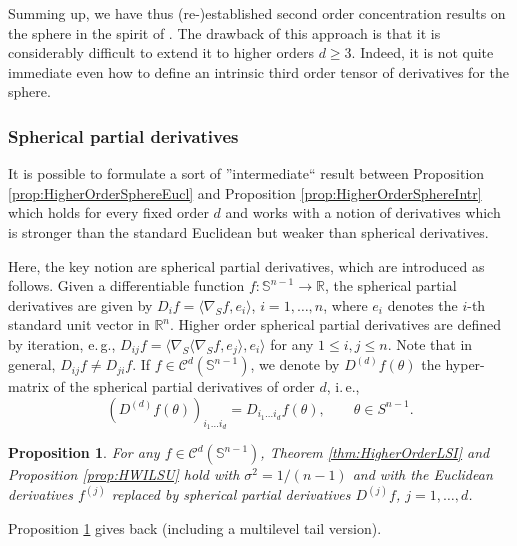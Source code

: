 \documentclass[a4paper,12pt]{amsart}
\numberwithin{equation}{section}
\newtheorem{proposition}[satz]{Proposition}
\theoremstyle{remark}
\def\S{{\mathbb S}}
\begin{document}
Summing up, we have thus (re-)established second order concentration results on the sphere in the spirit of \cite{BCG17}. The drawback of this approach is that it is considerably difficult to extend it to higher orders $d \ge 3$. Indeed, it is not quite immediate even how to define an intrinsic third order tensor of derivatives for the sphere.

\subsubsection{Spherical partial derivatives}
It is possible to formulate a sort of ''intermediate`` result between Proposition \ref{prop:HigherOrderSphereEucl} and Proposition \ref{prop:HigherOrderSphereIntr} which holds for every fixed order $d$ and works with a notion of derivatives which is stronger than the standard Euclidean but weaker than spherical derivatives.

Here, the key notion are spherical partial derivatives, which are introduced as follows. Given a differentiable function $f \colon \S^{n-1} \to \mathbb{R}$, the spherical partial derivatives are given by $D_i f = \langle \nabla_S f, e_i \rangle$, $i = 1, \ldots, n$, where $e_i$ denotes the $i$-th standard unit vector in $\mathbb{R}^n$. Higher order spherical partial derivatives are defined by iteration, e.\,g.,  $D_{ij} f = \langle \nabla_S \langle \nabla_S f, e_j \rangle, e_i \rangle$ for any $1 \le i,j \le n$. Note that in general, $D_{ij}f \ne D_{ji} f$. If $f \in \mathcal{C}^d(\S^{n-1})$, we denote by $D^{(d)} f (\theta)$ the hyper-matrix of the spherical partial derivatives of order $d$, i.\,e.,
\begin{equation*}
	(D^{(d)} f(\theta))_{i_1 \ldots i_d} = D_{i_1 \ldots i_d} f(\theta), \qquad
	\theta \in S^{n-1}.
\end{equation*}

\begin{proposition}\label{prop:HigherOrderSpherePart}
For any $f \in \mathcal{C}^d(\S^{n-1})$, Theorem \ref{thm:HigherOrderLSI} and Proposition \ref{prop:HWILSU} hold with $\sigma^2 = 1/(n-1)$ and with the Euclidean derivatives $f^{(j)}$ replaced by spherical partial derivatives $D^{(j)} f$, $j=1, \ldots, d$.
\end{proposition}

Proposition \ref{prop:HigherOrderSpherePart} gives back \cite[Th.\ 1.15]{BGS19} (including a multilevel tail version).
\end{document}
